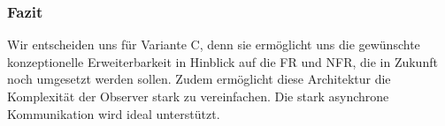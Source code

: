 \subsubsection{Fazit}
Wir entscheiden uns für Variante C, denn sie ermöglicht uns die gewünschte konzeptionelle Erweiterbarkeit in Hinblick auf die \ac{FR} und \ac{NFR}, die in Zukunft noch umgesetzt werden sollen. Zudem ermöglicht diese Architektur die Komplexität der Observer stark zu vereinfachen. Die stark asynchrone Kommunikation wird ideal unterstützt.
